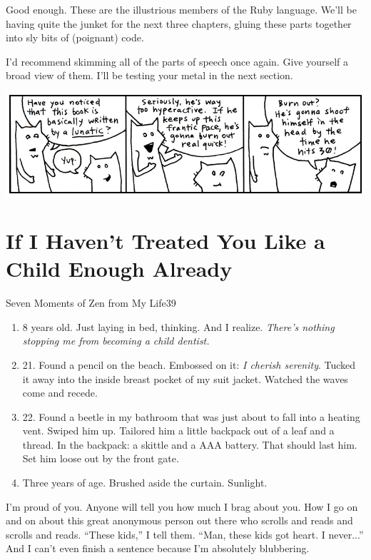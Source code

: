\documentclass[10pt,twoside]{report}
\begin{document}
Good enough.  These are the illustrious members of the Ruby language.
We'll be having quite the junket for the next three chapters, gluing
these parts together into sly bits of (poignant) code.

I'd recommend skimming all of the parts of speech once again.  Give
yourself a broad view of them.  I'll be testing your metal in the next
section.

	\includegraphics[width=1.0\textwidth]{cache/16.png}


\section{If I Haven't Treated You Like a Child Enough Already}

	\begin{sidebar}{Seven Moments of Zen from My Life}{39}
		\begin{enumerate}
			\item 8 years old. Just laying in bed, thinking. And I realize. \textit{There's nothing stopping me from becoming a child dentist.}
			\item 21. Found a pencil on the beach. Embossed on it: \textit{I cherish serenity}. Tucked it away into the inside breast pocket of my suit jacket. Watched the waves come and recede.
			\item 22. Found a beetle in my bathroom that was just about to fall into a heating vent. Swiped him up. Tailored him a little backpack out of a leaf and a thread. In the backpack: a skittle and a AAA battery. That should last him. Set him loose out by the front gate.
			\item Three years of age. Brushed aside the curtain. Sunlight.
		\end{enumerate}
	\end{sidebar}

I'm proud of you.  Anyone will tell you how much I brag about you.
How I go on and on about this great anonymous person out there who
scrolls and reads and scrolls and reads.  ``These kids,'' I tell them.
``Man, these kids got heart.  I never...''  And I can't even finish a
sentence because I'm absolutely blubbering.
\end{document}
